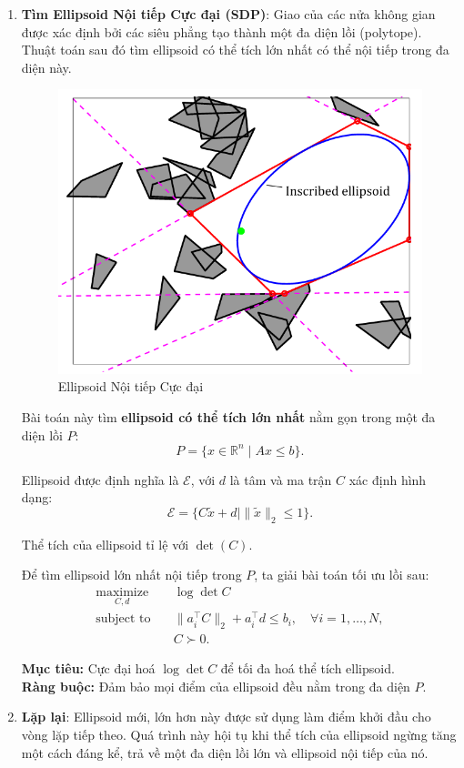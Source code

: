\documentclass{article}
\begin{document}
\begin{enumerate}
\newpage
\item \textbf{Tìm Ellipsoid Nội tiếp Cực đại (SDP)}: Giao của các nửa không gian được xác định bởi các siêu phẳng tạo thành một đa diện lồi (polytope). Thuật toán sau đó tìm ellipsoid có thể tích lớn nhất có thể nội tiếp trong đa diện này. 

\begin{figure}[!htp]
    \centering
    \includegraphics[width=0.5\linewidth]{imgs/iris_2.png}
    \caption{Ellipsoid Nội tiếp Cực đại}
\end{figure}

Bài toán này tìm \textbf{ellipsoid có thể tích lớn nhất} nằm gọn trong một đa diện lồi \( P \):
\begin{equation}
    P = \{x \in \mathbb{R}^n \mid A x \leq b\}.
\end{equation}

Ellipsoid được định nghĩa là \(\mathcal{E}\), với \(d\) là tâm và ma trận \(C\) xác định hình dạng:
\begin{equation}
    \mathcal{E} = \{C\tilde{x} + d \mid \|\tilde{x}\|_2 \leq 1\}.
\end{equation}

Thể tích của ellipsoid tỉ lệ với \(\det(C)\).

Để tìm ellipsoid lớn nhất nội tiếp trong \(P\), ta giải bài toán tối ưu lồi sau:
\begin{equation}
\begin{aligned}
    \underset{C,d}{\text{maximize}} \quad & \log \det C \\
    \text{subject to} \quad & \|a_i^{\top} C\|_2 + a_i^{\top} d \leq b_i, \quad \forall i = 1, \ldots, N, \\
    & C \succ 0.
\end{aligned}
\end{equation}

\noindent
\textbf{Mục tiêu:} Cực đại hoá \(\log \det C\) để tối đa hoá thể tích ellipsoid. \\[4pt]
\textbf{Ràng buộc:} Đảm bảo mọi điểm của ellipsoid đều nằm trong đa diện \(P\).



\item \textbf{Lặp lại}: Ellipsoid mới, lớn hơn này được sử dụng làm điểm khởi đầu cho vòng lặp tiếp theo. Quá trình này hội tụ khi thể tích của ellipsoid ngừng tăng một cách đáng kể, trả về một đa diện lồi lớn và ellipsoid nội tiếp của nó.
\end{enumerate}
\end{document}

